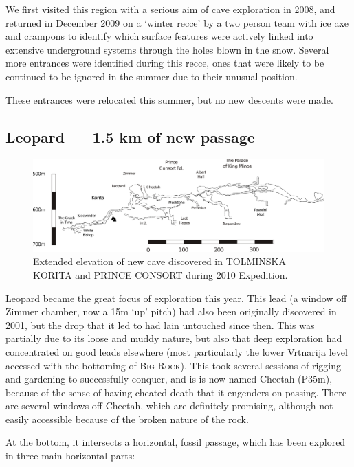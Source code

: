 We first visited this region with a serious aim of cave exploration in
2008, and returned in December 2009 on a `winter recce' by a two person
team with ice axe and crampons to identify which surface features were
actively linked into extensive underground systems through the holes
blown in the snow. Several more entrances were identified during this
recce, ones that were likely to be continued to be ignored in the summer
due to their unusual position.

These entrances were relocated this summer, but no new descents were
made.

\subsection{Leopard --- 1.5 km of new passage}

\begin{figure}
\centering
\includegraphics[width=0.9\columnwidth]{2010/2010_new_stuff_extended_extraction}
\caption{Extended elevation of new cave discovered in \textsc{TOLMINSKA KORITA} and \textsc{PRINCE
CONSORT} during 2010 Expedition.}
\end{figure}

Leopard became the great focus of exploration this year. This lead (a
window off Zimmer chamber, now a 15m `up' pitch) had also been
originally discovered in 2001, but the drop that it led to had lain
untouched since then. This was partially due to its loose and muddy
nature, but also that deep exploration had concentrated on good leads
elsewhere (most particularly the lower Vrtnarija level accessed with the
bottoming of \textsc{Big Rock}). This took several sessions of rigging
and gardening to successfully conquer, and is is now named Cheetah
(P35m), because of the sense of having cheated death that it engenders
on passing. There are several windows off Cheetah, which are definitely
promising, although not easily accessible because of the broken nature
of the rock.

At the bottom, it intersects a horizontal, fossil passage, which has
been explored in three main horizontal parts:


